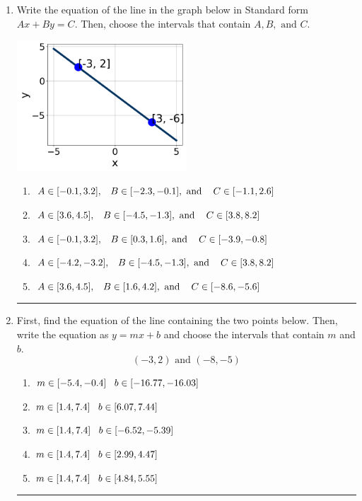 \documentclass[14pt]{extbook}
\newcommand{\litem}[1]{\item#1\hspace*{-1cm}\rule{\textwidth}{0.4pt}}
\begin{document}
\begin{enumerate}
\litem{
Write the equation of the line in the graph below in Standard form $Ax+By=C$. Then, choose the intervals that contain $A, B, \text{ and } C$.
\begin{center}
    \includegraphics[width=0.5\textwidth]{../Figures/linearGraphToStandardA.png}
\end{center}
\begin{enumerate}[label=\Alph*.]
\item \( A \in [-0.1, 3.2], \hspace{3mm} B \in [-2.3, -0.1], \text{ and } \hspace{3mm} C \in [-1.1, 2.6] \)
\item \( A \in [3.6, 4.5], \hspace{3mm} B \in [-4.5, -1.3], \text{ and } \hspace{3mm} C \in [3.8, 8.2] \)
\item \( A \in [-0.1, 3.2], \hspace{3mm} B \in [0.3, 1.6], \text{ and } \hspace{3mm} C \in [-3.9, -0.8] \)
\item \( A \in [-4.2, -3.2], \hspace{3mm} B \in [-4.5, -1.3], \text{ and } \hspace{3mm} C \in [3.8, 8.2] \)
\item \( A \in [3.6, 4.5], \hspace{3mm} B \in [1.6, 4.2], \text{ and } \hspace{3mm} C \in [-8.6, -5.6] \)

\end{enumerate} }
\litem{
First, find the equation of the line containing the two points below. Then, write the equation as $ y=mx+b $ and choose the intervals that contain $m$ and $b$.\[ (-3, 2) \text{ and } (-8, -5) \]\begin{enumerate}[label=\Alph*.]
\item \( m \in [-5.4, -0.4] \hspace*{3mm} b \in [-16.77, -16.03] \)
\item \( m \in [1.4, 7.4] \hspace*{3mm} b \in [6.07, 7.44] \)
\item \( m \in [1.4, 7.4] \hspace*{3mm} b \in [-6.52, -5.39] \)
\item \( m \in [1.4, 7.4] \hspace*{3mm} b \in [2.99, 4.47] \)
\item \( m \in [1.4, 7.4] \hspace*{3mm} b \in [4.84, 5.55] \)


\end{enumerate}}
\end{enumerate}
\end{document}
